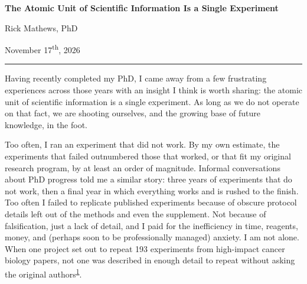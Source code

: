 \documentclass[12pt]{article}
\begin{document}
\RaggedRight
\begin{center}
  {\fontsize{21}{25.2}\selectfont\bfseries The Atomic Unit of Scientific Information Is a Single Experiment\par}
  \vspace{9pt}
  {\large Rick Mathews, PhD\par}
  \vspace{3pt}
  {\small November 17\textsuperscript{th}, 2026\par}
\end{center}
\vspace{2pt}
{\color{rule}\noindent\rule{\textwidth}{0.4pt}}\par
\vspace{-4pt}

\fontsize{13.0}{18.85}\selectfont
\setlength{\parskip}{6.5pt}
Having recently completed my PhD, I came away from a few frustrating experiences across those years with an insight I think is worth sharing: the atomic unit of scientific information is a single experiment. As long as we do not operate on that fact, we are shooting ourselves, and the growing base of future knowledge, in the foot.

Too often, I ran an experiment that did not work. By my own estimate, the experiments that failed outnumbered those that worked, or that fit my original research program, by at least an order of magnitude. Informal conversations about PhD progress told me a similar story: three years of experiments that do not work, then a final year in which everything works and is rushed to the finish. Too often I failed to replicate published experiments because of obscure protocol details left out of the methods and even the supplement. Not because of falsification, just a lack of detail, and I paid for the inefficiency in time, reagents, money, and (perhaps soon to be professionally managed) anxiety. I am not alone. When one project set out to repeat 193 experiments from high-impact cancer biology papers, not one was described in enough detail to repeat without asking the original authors\textsuperscript{\hyperlink{ref-errington2021}{1}}.
\end{document}
